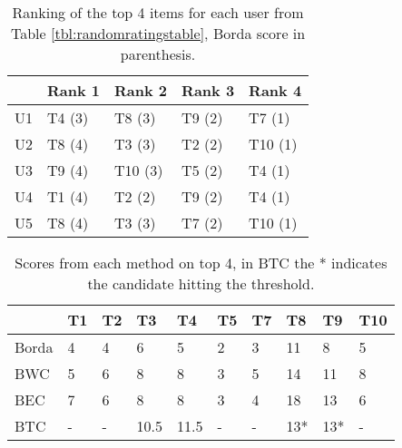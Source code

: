 \begin{table}[H]
	\centering
	\begin{tabular}{l|l|l|l|l|}
		\cline{2-5}
		& Rank 1 & Rank 2 & Rank 3 & Rank 4 \\ \hline
		\multicolumn{1}{|l|}{U1} & T4 (3) & T8 (3) & T9 (2) & T7 (1) \\ \hline
		\multicolumn{1}{|l|}{U2} & T8 (4) & T3 (3) & T2 (2) & T10 (1) \\ \hline
		\multicolumn{1}{|l|}{U3} & T9 (4) & T10 (3) & T5 (2) & T4 (1) \\ \hline
		\multicolumn{1}{|l|}{U4} & T1 (4) & T2 (2) & T9 (2) & T4 (1) \\ \hline
		\multicolumn{1}{|l|}{U5} & T8 (4) & T3 (3) & T7 (2) & T10 (1) \\ \hline
	\end{tabular}
	\caption{Ranking of the top 4 items for each user from Table \ref{tbl:randomratingstable}, Borda score in parenthesis.}
	\label{tbl:top4borda}
\end{table}

\begin{table}[H]
	\centering
	\begin{tabular}{l|l|l|l|l|l|l|l|l|l|}
		\cline{2-10}
		& T1 & T2 & T3   & T4   & T5 & T7 & T8  & T9  & T10 \\ \hline
		\multicolumn{1}{|l|}{Borda} & 4  & 4  & 6    & 5    & 2  & 3  & 11  & 8   & 5   \\ \hline
		\multicolumn{1}{|l|}{BWC}   & 5  & 6  & 8    & 8    & 3  & 5  & 14  & 11  & 8   \\ \hline
		\multicolumn{1}{|l|}{BEC}   & 7  & 6  & 8    & 8    & 3  & 4  & 18  & 13  & 6   \\ \hline
		\multicolumn{1}{|l|}{BTC}   & -  & -  & 10.5 & 11.5 & -  & -  & 13* & 13* & -   \\ \hline
	\end{tabular}
	\caption{Scores from each method on top 4, in BTC the * indicates the candidate hitting the threshold.}
	\label{tbl:novelscoresexample}
\end{table}